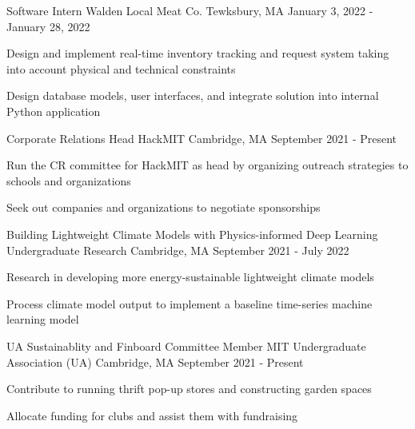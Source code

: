 \documentclass[12pt, letterpaper]{awesome-cv}
\begin{document}
\begin{cventries}
  \cventry
      {Software Intern} %
      {Walden Local Meat Co.} %
      {Tewksbury, MA} %
      {January 3, 2022 - January 28, 2022} %
      {
        \begin{cvitems} %
          \item {Design and implement real-time inventory tracking and request system taking into account physical and technical constraints}
          \item {Design database models, user interfaces, and integrate solution into internal Python application}
      \end{cvitems}
    }

  \cventry
    {Corporate Relations Head} %
    {HackMIT} %
    {Cambridge, MA} %
    {September 2021 - Present} %
    {
      \begin{cvitems} %
        \item {Run the CR committee for HackMIT as head by organizing outreach strategies to schools and organizations}
        \item {Seek out companies and organizations to negotiate sponsorships}
      \end{cvitems}
    }

  \cventry
    {Building Lightweight Climate Models with Physics-informed Deep Learning } %
    {Undergraduate Research} %
    {Cambridge, MA} %
    {September 2021 - July 2022} %
    {
      \begin{cvitems} %
        \item {Research in developing more energy-sustainable lightweight climate models}
        \item {Process climate model output to implement a baseline time-series machine learning model}
      \end{cvitems}
    }


    \cventry
      {UA Sustainablity and Finboard Committee Member} %
      {MIT Undergraduate Association (UA)} %
      {Cambridge, MA} %
      {September 2021 - Present} %
      {
        \begin{cvitems} %
          \item {Contribute to running thrift pop-up stores and constructing garden spaces}
          \item {Allocate funding for clubs and assist them with fundraising}
      \end{cvitems}
    }


  \end{cventries} 
\end{document}

